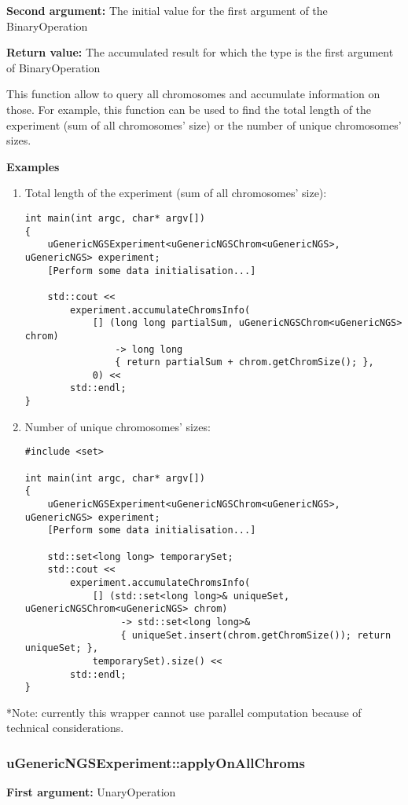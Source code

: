 \documentclass[letterpaper,10pt]{article}
\begin{document}
\noindent{}\textbf{Second argument:} The initial value for the first argument of the BinaryOperation

\noindent{}\textbf{Return value:} The accumulated result for which the type is the first argument of BinaryOperation

\bigskip
\noindent{}This function allow to query all chromosomes and accumulate information on those. For example, this function can be used to find the total length of the experiment (sum of all chromosomes' size) or the number of unique chromosomes' sizes.

\bigskip
\noindent{}\textbf{Examples}
\begin{enumerate}
 \item Total length of the experiment (sum of all chromosomes' size):
\begin{verbatim}
int main(int argc, char* argv[])
{
    uGenericNGSExperiment<uGenericNGSChrom<uGenericNGS>, uGenericNGS> experiment;
    [Perform some data initialisation...]

    std::cout << 
        experiment.accumulateChromsInfo(
            [] (long long partialSum, uGenericNGSChrom<uGenericNGS> chrom) 
                -> long long 
                { return partialSum + chrom.getChromSize(); }, 
            0) << 
        std::endl;
}
\end{verbatim}

\item Number of unique chromosomes' sizes:
\begin{verbatim}
#include <set>

int main(int argc, char* argv[])
{
    uGenericNGSExperiment<uGenericNGSChrom<uGenericNGS>, uGenericNGS> experiment;
    [Perform some data initialisation...]

    std::set<long long> temporarySet;
    std::cout << 
        experiment.accumulateChromsInfo(
            [] (std::set<long long>& uniqueSet, uGenericNGSChrom<uGenericNGS> chrom) 
                 -> std::set<long long>& 
                 { uniqueSet.insert(chrom.getChromSize()); return uniqueSet; }, 
            temporarySet).size() << 
        std::endl;
}
\end{verbatim}
\end{enumerate}

\noindent{}*Note: currently this wrapper cannot use parallel computation because of technical considerations.

\subsubsection{uGenericNGSExperiment::applyOnAllChroms}
\textbf{First argument:} UnaryOperation
\end{document}
